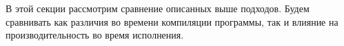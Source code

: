 В этой секции рассмотрим сравнение описанных выше подходов. \cite{poletto1999}
Будем сравнивать как различия во времени компиляции программы,
так и влияние на производительность во время исполнения.
